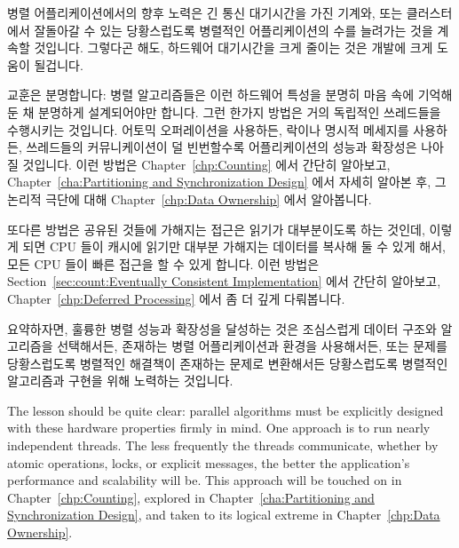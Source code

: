 {	병렬 어플리케이션에서의 향후 노력은 긴 통신 대기시간을 가진 기계와,
	또는 클러스터에서 잘돌아갈 수 있는 당황스럽도록 병렬적인 어플리케이션의
	수를 늘려가는 것을 계속할 것입니다.
	그렇다곤 해도, 하드웨어 대기시간을 크게 줄이는 것은 개발에 크게 도움이
	될겁니다.

	\iffalse
	It is likely that continued work on parallel applications will
	increase the number of embarrassingly parallel applications that
	can run well on machines and/or clusters having long communications
	latencies.
	That said, greatly reduced hardware latencies would be an
	extremely welcome development.
	\fi
} \QuickQuizEnd

교훈은 분명합니다:
병렬 알고리즘들은 이런 하드웨어 특성을 분명히 마음 속에 기억해 둔 채 분명하게
설계되어야만 합니다.
그런 한가지 방법은 거의 독립적인 쓰레드들을 수행시키는 것입니다.
어토믹 오퍼레이션을 사용하든, 락이나 명시적 메세지를 사용하든, 쓰레드들의
커뮤니케이션이 덜 빈번할수록 어플리케이션의 성능과 확장성은 나아질 것입니다.
이런 방법은
Chapter~\ref{chp:Counting} 에서 간단히 알아보고,
Chapter~\ref{cha:Partitioning and Synchronization Design} 에서 자세히 알아본 후,
그 논리적 극단에 대해
Chapter~\ref{chp:Data Ownership} 에서 알아봅니다.

또다른 방법은 공유된 것들에 가해지는 접근은 읽기가 대부분이도록 하는 것인데,
이렇게 되면 CPU 들이 캐시에 읽기만 대부분 가해지는 데이터를 복사해 둘 수 있게
해서, 모든 CPU 들이 빠른 접근을 할 수 있게 합니다.
이런 방법은
Section~\ref{sec:count:Eventually Consistent Implementation} 에서 간단히
알아보고,
Chapter~\ref{chp:Deferred Processing} 에서 좀 더 깊게 다뤄봅니다.

요약하자면, 훌륭한 병렬 성능과 확장성을 달성하는 것은 조심스럽게 데이터 구조와
알고리즘을 선택해서든, 존재하는 병렬 어플리케이션과 환경을 사용해서든, 또는
문제를 당황스럽도록 병렬적인 해결책이 존재하는 문제로 변환해서든 당황스럽도록
병렬적인 알고리즘과 구현을 위해 노력하는 것입니다.

\iffalse
The lesson should be quite clear:
parallel algorithms must be explicitly designed with these hardware
properties firmly in mind.
One approach is to run nearly independent threads.
The less frequently the threads communicate, whether by atomic operations,
locks, or explicit messages, the better the application's performance
and scalability will be.
This approach will be touched on in
Chapter~\ref{chp:Counting},
explored in
Chapter~\ref{cha:Partitioning and Synchronization Design},
and taken to its logical extreme in
Chapter~\ref{chp:Data Ownership}.

